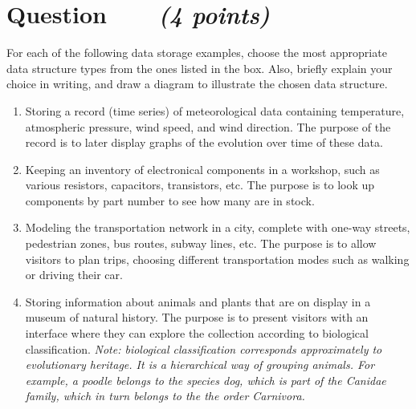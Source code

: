 \documentclass[a4paper]{article}
\newcounter{question}
\newcommand{\question}[1]{\refstepcounter{question}\section*{Question~\thequestion~~~\small\emph{(#1)}}}
\renewcommand*\thequestion{\arabic{question}}
\begin{document}
\pagebreak
\pagestyle{plain}
\thispagestyle{plain}
\setcounter{page}{1}



\question{4 points}

For each of the following data storage examples, choose the most appropriate data structure types from the ones listed in the box.
Also, briefly explain your choice in writing, and draw a diagram to illustrate the chosen data structure.

\begin{center}
\end{center}


\begin{enumerate}
\item
  Storing a record (time series) of meteorological data containing temperature, atmospheric pressure, wind speed, and wind direction.
  The purpose of the record is to later display graphs of the evolution over time of these data.
\item
  Keeping an inventory of electronical components in a workshop, such as various resistors, capacitors, transistors, etc.
  The purpose is to look up components by part number to see how many are in stock.
\item
  Modeling the transportation network in a city, complete with one-way streets, pedestrian zones, bus routes, subway lines, etc.
  The purpose is to allow visitors to plan trips, choosing different transportation modes such as walking or driving their car.
\item
  Storing information about animals and plants that are on display in a museum of natural history.
  The purpose is to present visitors with an interface where they can explore the collection according to biological classification.
  \emph{Note: biological classification corresponds approximately to evolutionary heritage.
    It is a hierarchical way of grouping animals.
    For example, a poodle belongs to the \emph{species} dog, which is part of the Canidae \emph{family}, which in turn belongs to the the \emph{order} Carnivora.}
\end{enumerate}
\end{document}
